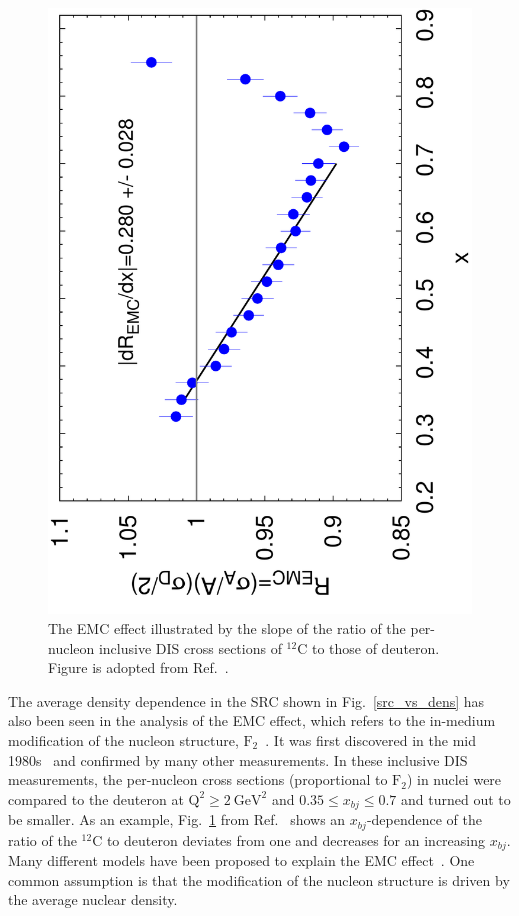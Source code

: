 \begin{figure}[!ht]
  \begin{center}
    \includegraphics[type=pdf,ext=.pdf,read=.pdf,angle=270,width=0.60\linewidth]{./figures/physics/e03103_carbon}
    \caption[The EMC effect]{\footnotesize{The EMC effect illustrated by the slope of the ratio of the per-nucleon inclusive DIS cross sections of $\mathrm{^{12}C}$ to those of deuteron. Figure is adopted from Ref.~\cite{PhysRevLett.103.202301}.}}
    \label{emc_slop_03013}
  \end{center}
\end{figure}  
 The average density dependence in the SRC shown in Fig.~\ref{src_vs_dens} has also been seen in the analysis of the EMC effect, which refers to the in-medium modification of the nucleon structure, $\mathrm{F_{2}}$~\cite{EMC_Review_1995, EMC_Review_2003}. It was first discovered in the mid 1980s~\cite{EMC_first} and confirmed by many other measurements. In these inclusive DIS measurements, the per-nucleon cross sections (proportional to $\mathrm{F_{2}}$) in nuclei were compared to the deuteron at $\mathrm{Q^{2}\geq 2~GeV^{2}}$ and $0.35\leq x_{bj} \leq 0.7$ and turned out to be smaller. As an example, Fig.~\ref{emc_slop_03013} from Ref.~\cite{PhysRevLett.103.202301} shows an $x_{bj}$-dependence of the ratio of the $\mathrm{^{12}C}$ to deuteron deviates from one and decreases for an increasing $x_{bj}$. Many different models have been proposed to explain the EMC effect~\cite{EMC_Review_1995, EMC_Review_2003}. One common assumption is that the modification of the nucleon structure is driven by the average nuclear density. 
 
